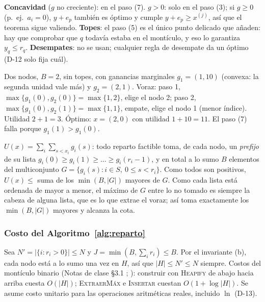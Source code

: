 \begin{observacion}\label{obs:gcero}
\textbf{Concavidad} ($g$ no creciente): en el paso (7). \textbf{$g>0$}: solo en el paso (3); si $g\ge0$ (p.\ ej.\ $a_i=0$), $y+e_p$ también es óptimo y cumple $y+e_p\ge x^{(j)}$, así que el teorema sigue valiendo. \textbf{Topes}: el paso (5) es el único punto delicado que añaden: hay que comprobar que $q$ todavía estaba en el montículo, y eso lo garantiza $y_q\le r_q$. \textbf{Desempates}: no se usan; cualquier regla de desempate da un óptimo (D-12 solo fija cuál).
\end{observacion}

\begin{contraejemplo}
Dos nodos, $B=2$, sin topes, con ganancias marginales $g_1=(1,10)$ (convexa: la segunda unidad vale más) y $g_2=(2,1)$. Voraz: paso 1, $\max\{g_1(0),g_2(0)\}=\max\{1,2\}$, elige el nodo 2; paso 2, $\max\{g_1(0),g_2(1)\}=\max\{1,1\}$, empate, elige el nodo 1 (menor índice). Utilidad $2+1=3$. Óptimo: $x=(2,0)$ con utilidad $1+10=11$. El paso (7) falla porque $g_1(1)>g_1(0)$.
\end{contraejemplo}

\begin{observacion}
$U(x)=\sum_i\sum_{s<x_i}g_i(s)$: todo reparto factible toma, de cada nodo, un \emph{prefijo} de su lista $g_i(0)\ge g_i(1)\ge\dots\ge g_i(r_i-1)$, y en total a lo sumo $B$ elementos del multiconjunto $G=\{g_i(s):i\in S,\ 0\le s<r_i\}$. Como todos son positivos, $U(x)\le$ suma de los $\min(B,|G|)$ mayores de $G$. Como cada lista está ordenada de mayor a menor, el máximo de $G$ entre lo no tomado es siempre la cabeza de alguna lista, que es lo que extrae el voraz; así toma exactamente los $\min(B,|G|)$ mayores y alcanza la cota.
\end{observacion}

\subsubsection{Costo del Algoritmo~\ref{alg:reparto}}\label{sec:costoP1}
Sea $N'=|\{i:r_i>0\}|\le N$ y $J=\min(B,\sum_ir_i)\le B$. Por el invariante (b), cada nodo está a lo sumo una vez en $H$, así que $|H|\le N'\le N$ siempre. Costos del montículo binario (Notas de clase §3.1 \cite{notas}; \cite[cap.~6]{clrs}): construir con \textsc{Heapify} de abajo hacia arriba cuesta $O(|H|)$; \textsc{ExtraerMáx} e \textsc{Insertar} cuestan $O(1+\log|H|)$. Se asume costo unitario para las operaciones aritméticas reales, incluido $\ln$ (D-13).

